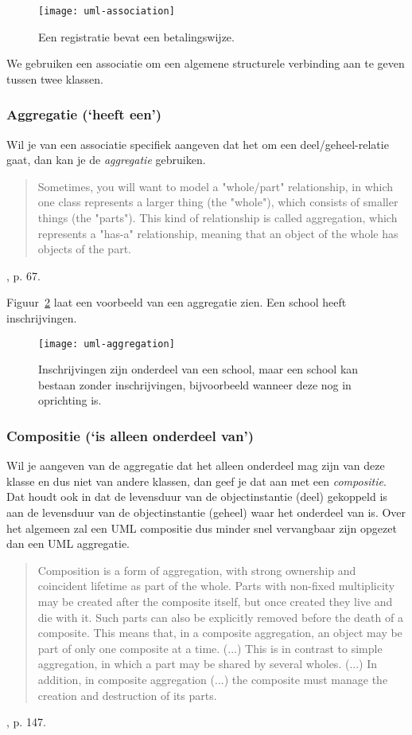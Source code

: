 \begin{figure}[H]
    \centering
    \texttt{[image: uml-association]}
    \caption{Een registratie bevat een betalingswijze.}
    \label{fig:uml-association}
\end{figure}

We gebruiken een associatie om een algemene structurele verbinding aan te 
geven tussen twee klassen.

\subsubsection{Aggregatie (`heeft een')}
Wil je van een associatie specifiek aangeven dat het om een 
deel/geheel-relatie gaat, dan kan je de \textit{aggregatie} gebruiken.

\blockquote{
    Sometimes, you will want to model a "whole/part" relationship,
    in which one class represents a larger thing (the "whole"),
    which consists of smaller things (the "parts"). This kind of
    relationship is called aggregation, which represents a "has-a"
    relationship, meaning that an object of the whole has objects
    of the part.
}{\cite{Booch1999}, p. 67.}

Figuur~\ref{fig:uml-aggregation} laat een voorbeeld van een aggregatie zien.
Een school heeft inschrijvingen.

\begin{figure}[H]
    \centering
    \texttt{[image: uml-aggregation]}
    \caption{Inschrijvingen zijn onderdeel van een school, maar een school kan bestaan zonder inschrijvingen,
    bijvoorbeeld wanneer deze nog in oprichting is.}
    \label{fig:uml-aggregation}
\end{figure}

\subsubsection{Compositie (`is alleen onderdeel van')}
Wil je aangeven van de aggregatie dat het alleen onderdeel
mag zijn van deze klasse en dus niet van andere klassen,
dan geef je dat aan met een \textit{compositie}.
Dat houdt ook in dat de levensduur van de objectinstantie (deel)
gekoppeld is aan de levensduur van de objectinstantie (geheel)
waar het onderdeel van is. Over het algemeen zal een UML compositie 
dus minder snel vervangbaar zijn opgezet dan een UML aggregatie.

\blockquote{
    Composition is a form of aggregation, 
    with strong ownership and coincident lifetime
    as part of the whole. Parts with non-fixed multiplicity 
    may be created after the composite itself,
    but once created they live and die with it. 
    Such parts can also be explicitly removed before the 
    death of a composite.
    \newline\newline
    This means that, in a composite aggregation, 
    an object may be part of only one composite at a time.
    (...) This is in contrast to simple aggregation, 
    in which a part may be shared by several wholes. 
    (...) In addition, in composite aggregation (...) 
    the composite must manage the creation and destruction of its parts.
}{\cite{Booch1999}, p. 147.}

